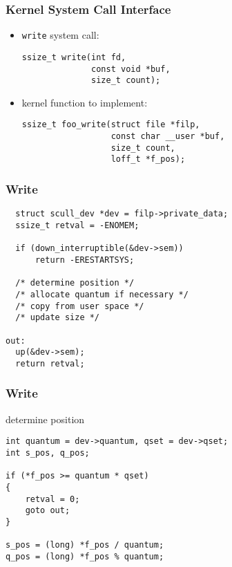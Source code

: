 \documentclass[dvipsnames]{beamer}
\begin{document}
\begin{frame}[fragile]
  \frametitle{Kernel System Call Interface}

  \begin{itemize}
    \item \lstinline|write| system call:
    \begin{lstlisting}
ssize_t write(int fd,
              const void *buf,
              size_t count);
    \end{lstlisting}

    \medskip
    \item kernel function to implement:
    \begin{lstlisting}
ssize_t foo_write(struct file *filp,
                  const char __user *buf,
                  size_t count,
                  loff_t *f_pos);
    \end{lstlisting}
  \end{itemize}
\end{frame}

\begin{frame}[fragile]
  \frametitle{Write}

  \begin{exampleblock}{}
    \begin{lstlisting}
  struct scull_dev *dev = filp->private_data;
  ssize_t retval = -ENOMEM;

  if (down_interruptible(&dev->sem))
      return -ERESTARTSYS;

  /* determine position */
  /* allocate quantum if necessary */
  /* copy from user space */
  /* update size */

out:
  up(&dev->sem);
  return retval;
    \end{lstlisting}
  \end{exampleblock}
\end{frame}

\begin{frame}[fragile]
  \frametitle{Write}

  \begin{exampleblock}{determine position}
    \begin{lstlisting}
int quantum = dev->quantum, qset = dev->qset;
int s_pos, q_pos;

if (*f_pos >= quantum * qset)
{
    retval = 0;
    goto out;
}

s_pos = (long) *f_pos / quantum;
q_pos = (long) *f_pos % quantum;
    \end{lstlisting}
  \end{exampleblock}
\end{frame}
\end{document}
